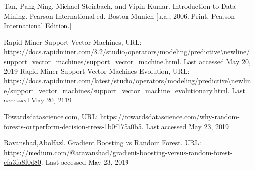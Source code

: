\documentclass[runningheads]{llncs}
\begin{document}
\begin{thebibliography}{8}
Tan, Pang-Ning, Michael Steinbach, and Vipin Kumar. Introduction to Data Mining. Pearson International ed. Boston Munich [u.a., 2006. Print. Pearson International Edition.]

Rapid Miner Support Vector Machines, URL: \url{https://docs.rapidminer.com/8.2/studio/operators/modeling/predictive\newline/support\_vector\_machines/support\_vector\_machine.html}. Last accessed May 20, 2019
%
Rapid Miner Support Vector Machines Evolution, URL: \url{https://docs.rapidminer.com/latest/studio/operators/modeling/predictive\newline/support\_vector\_machines/support\_vector\_machine\_evolutionary.html}. Last accessed May 20, 2019

Towardsdatascience.com, URL: \url{https://towardsdatascience.com/why-random-forests-outperform-decision-trees-1b0f175a0b5}. Last accessed May 23, 2019

Ravanshad,Abolfazl. Gradient Boosting vs Random Forest. URL: \url{https://medium.com/@aravanshad/gradient-boosting-versus-random-forest-cfa3fa8f0d80}. Last accessed May 23, 2019



\end{thebibliography}
\end{document}
